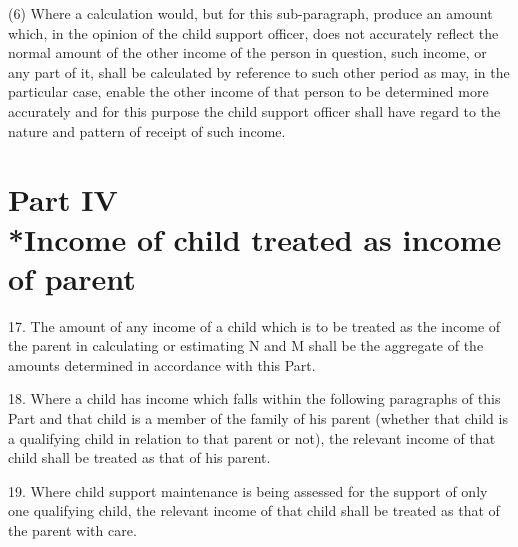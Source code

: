 \documentclass[12pt,a4paper]{article}
\begin{document}
(6) Where a calculation would, but for this sub-paragraph, produce an amount which, in the opinion of the child support officer, does not accurately reflect the normal amount of the other income of the person in question, such income, or any part of it, shall be calculated by reference to such other period as may, in the particular case, enable the other income of that person to be determined more accurately and for this purpose the child support officer shall have regard to the nature and pattern of receipt of such income.

\section[Part IV --- Income of child treated as income of parent]{Part IV\\*Income of child treated as income of parent}

\renewcommand\parthead{--- Schedule 1 Part IV}

17.  The amount of any income of a child which is to be treated as the income of the parent in calculating or estimating N and M shall be the aggregate of the amounts determined in accordance with this Part.

\medskip

18.  Where a child has income which falls within the following paragraphs of this Part and that child is a member of the family of his parent (whether that child is a qualifying child in relation to that parent or not), the relevant income of that child shall be treated as that of his parent.

\medskip

19.  Where child support maintenance is being assessed for the support of only one qualifying child, the relevant income of that child shall be treated as that of the parent with care.

\medskip
\end{document}
